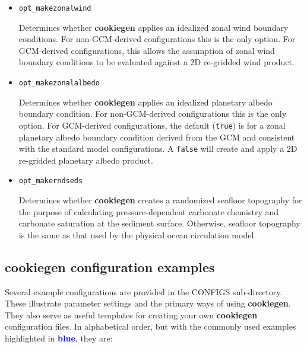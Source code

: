 \begin{itemize}
\begin{itemize}[noitemsep]

\vspace{1mm}
\item \texttt{opt\_makezonalwind}

Determines whether \textbf{cookiegen} applies an idealized zonal wind boundary conditions. For non-GCM-derived configurations this is the only option. For GCM-derived configurations, this allows the assumption of zonal wind boundary conditions to be evaluated against a 2D re-gridded wind product.

\vspace{1mm}
\item \texttt{opt\_makezonalalbedo}

Determines whether \textbf{cookiegen} applies an idealized planetary albedo boundary condition. For non-GCM-derived configurations this is the only option. For GCM-derived configurations, the default (\texttt{true}) is for a zonal planetary albedo boundary condition derived from the GCM and consistent with the standard model configurations. A \texttt{false} will create and apply a 2D re-gridded planetary albedo product.

\vspace{1mm}
\item \texttt{opt\_makerndseds}

Determines whether \textbf{cookiegen} creates a randomized seafloor topography for the purpose of calculating pressure-dependent carbonate chemistry and carbonate saturation at the sediment surface. Otherwise, seafloor topography is the same as that used by the physical ocean circulation model.

\end{itemize}

\end{itemize}

\newpage

\subsection{cookiegen configuration examples}

Several example configurations are provided in the \textsf{\footnotesize CONFIGS} sub-directory. These illustrate parameter settings and the primary ways of using \textbf{cookiegen}. They also serve as useful templates for creating your own \textbf{cookiegen} configuration files. In alphabetical order, but with the commonly used examples highlighted in \textcolor{blue}{\textbf{blue}}, they are:

